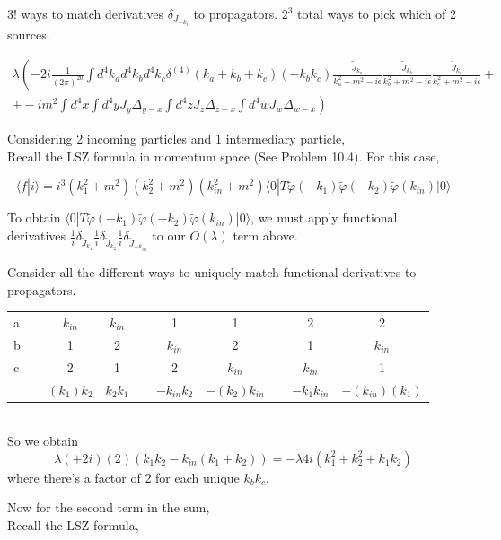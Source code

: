 \documentclass[twoside]{amsart}
\begin{document}
$3!$ ways to match derivatives $\delta_{J_{-k_i}}$ to propagators.  $2^3$ total ways to pick which of 2 sources.  

\[
\begin{gathered}
  \lambda \left( - 2i \frac{1}{(2\pi)^{20}} \int d^4k_a d^4k_b d^4k_c \delta^{(4)}(k_a + k_b + k_c)(-k_b k_c) \frac{ \widetilde{J}_{k_a} }{ k_a^2 + m^2 - i\epsilon } \frac{ \widetilde{J}_{k_b}}{ k_b^2 + m^2 - i \epsilon}  \frac{ \widetilde{J}_{k_c}}{ k_c^2  +m^2 - i \epsilon }  + \right. \\ 
\left.   + -i m^2 \int d^4x \int d^4y J_y \Delta_{y-x} \int d^4z J_z \Delta_{z-x} \int d^4w J_w \Delta_{w-x} \right)
\end{gathered}
\]

Considering 2 incoming particles and 1 intermediary particle, \\
\quad Recall the LSZ formula in momentum space (See Problem 10.4).  For this case,

\[
\langle f | i \rangle = i^3 (k_1^2 + m^2 )(k_2^2 + m^2 ) ( k_{in}^2 + m^2 ) \langle 0 | T\widetilde{\varphi}(-k_1) \widetilde{\varphi}(-k_2) \widetilde{ \varphi}(k_{in}) | 0 \rangle
\]

To obtain $ \langle 0 | T\widetilde{\varphi}(-k_1) \widetilde{\varphi}(-k_2) \widetilde{ \varphi}(k_{in}) | 0 \rangle$, we must apply functional derivatives $\frac{1}{i} \delta_{\widetilde{J}_{k_1}} \frac{1}{i} \delta_{\widetilde{J}_{k_2}} \frac{1}{i} \delta_{\widetilde{J}_{-k_{in}} }$ to our $O(\lambda)$ term above.  

Consider all the different ways to uniquely match functional derivatives to propagators.  

\begin{tabular}{ l r c c r c c r c c }
  a & \, & $k_{in}$ & $k_{in}$ & \, & 1 & 1 & \, & 2 & 2  \\ 
  b & \, & 1 & 2 & \, & $k_{in}$ & 2 & \, & 1 & $k_{in}$  \\ 
  c & \, & 2 & 1 & \, & 2 & $k_{in}$ & \, & $k_{in}$ & 1    \\
  & &  $(k_1)k_2$ & $k_2 k_1$  & & $-k_{in} k_2$  & $-(k_2)k_{in}$  & & $-k_1 k_{in} $ & $-(k_{in})(k_1)$ 
\end{tabular} \\

So we obtain 
\[
\lambda ( + 2 i ) ( 2) ( k_1 k_2 - k_{in} ( k_1 + k_2) ) = - \lambda 4 i (k_1^2 + k_2^2 + k_1 k_2) 
\]
where there's a factor of 2 for each unique $k_b k_c$.  

Now for the second term in the sum, \\
\phantom{Now} Recall the LSZ formula,
\end{document}
